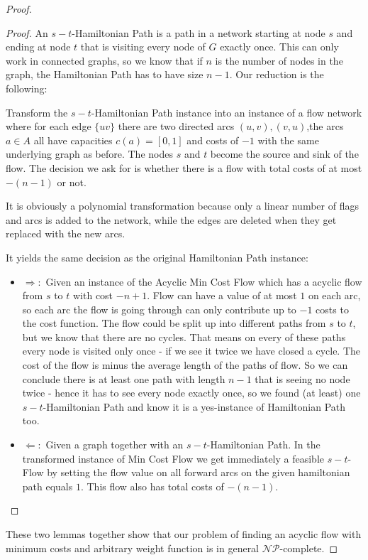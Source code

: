 \begin{proof}
\begin{proof}
An $s-t$-Hamiltonian Path is a path in a network starting at node $s$ and ending at node $t$ that is visiting every 
node of $G$ exactly once. This can only work in connected graphs, so we know that if $n$ is the number of nodes in the 
graph, the Hamiltonian Path has to have size $n-1$. Our reduction is the following:

Transform the $s-t$-Hamiltonian Path instance into an instance of a flow network where for each edge $\{uv\}$ there 
are two directed arcs $(u,v),(v,u)$,the arcs $a\in A$ all have capacities $c(a)=[0,1]$ and costs of $-1$ 
with the same underlying graph as before. The nodes $s$ and $t$ become the source and sink of the flow.%
The decision we ask for is whether there is a flow with total costs of at most $-(n-1)$ or not.

It is obviously a polynomial transformation because only a linear number of flags and arcs is added to the network, 
while the edges are deleted when they get replaced with the new arcs.

It yields the same decision as the original Hamiltonian Path instance:
\begin{itemize}
 \item $\Rightarrow:$ Given an instance of the Acyclic Min Cost Flow which has a acyclic flow from $s$ to $t$ with cost 
$-n+1$.
Flow can have a value of at most $1$ on each arc, so each arc the flow is going through can only contribute up to $-1$ 
costs to the cost function. The flow could be split up into different paths from $s$ to $t$, but we know that there are 
no cycles. That means on every of these paths every node is visited only once - if we see it twice we have closed a 
cycle. The cost of the flow is minus the average length of the paths of flow. So we can conclude there is at least one 
path with length $n-1$ that is seeing no node twice - hence it has to see every node exactly once, so we found (at 
least) one $s-t$-Hamiltonian Path and know it is a yes-instance of Hamiltonian Path too.

\item $\Leftarrow:$ Given a graph together with an $s-t$-Hamiltonian Path. In the transformed instance of Min Cost Flow 
we get immediately a feasible $s-t$-Flow by setting the flow value on all forward arcs on the given hamiltonian path 
equals $1$. This flow also has total costs of $-(n-1)$.
\end{itemize}
\end{proof}

These two lemmas together show that our problem of finding an acyclic flow with minimum costs and arbitrary weight 
function is in general $\mathcal{NP}$-complete.
\end{proof}
